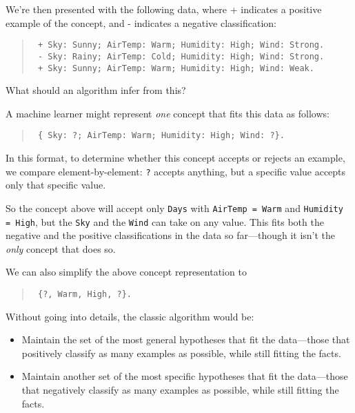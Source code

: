 { We're then presented with the following data,
where + indicates a positive example of the concept, and - indicates a
negative classification:

\begin{verse}
\texttt{ + Sky: Sunny; AirTemp: Warm; Humidity: High; Wind: Strong. } \\
\texttt{ - Sky: Rainy; AirTemp: Cold; Humidity: High; Wind: Strong. } \\
\texttt{ + Sky: Sunny; AirTemp: Warm; Humidity: High; Wind: Weak. } \\
\end{verse}


 What should an algorithm infer from this?


 A machine learner might represent \textit{one} concept that fits
this data as follows:

\begin{verse}
  \texttt{ \{ Sky: ?; AirTemp: Warm; Humidity: High; Wind: ?\}. }\\
\end{verse}


 In this format, to determine whether this concept accepts or
rejects an example, we compare element-by-element: \texttt{?} accepts anything,
but a specific value accepts only that specific value.


 So the concept above will accept only \texttt{Days} with \texttt{AirTemp = Warm} and
\texttt{Humidity = High}, but the \texttt{Sky} and the \texttt{Wind} can take on any value. This
fits both the negative and the positive classifications in the data so
far---though it isn't the \textit{only} concept that
does so.


 We can also simplify the above concept representation to

\begin{verse}
\texttt{ \{?, Warm, High, ?\}.}
\end{verse}



 Without going into details, the classic algorithm would be:

\begin{itemize}
\item{
 Maintain the set of the most general hypotheses that fit the
data---those that positively classify as many examples as possible,
while still fitting the facts.}

\item{
 Maintain another set of the most specific hypotheses that fit the
data---those that negatively classify as many examples as possible,
while still fitting the facts.}


\end{itemize}}
